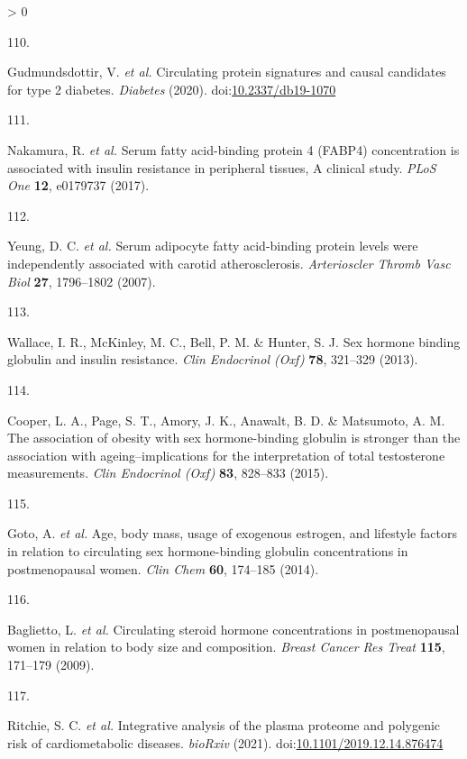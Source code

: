 \documentclass[11pt,twoside]{bristolthesis}
\newlength{\cslhangindent}
\newlength{\csllabelwidth}
\newenvironment{CSLReferences}[2] %
 {%
  \setlength{\parindent}{0pt}
  \ifodd #1 \everypar{\setlength{\hangindent}{\cslhangindent}}\ignorespaces\fi
  \ifnum #2 > 0
  \setlength{\parskip}{#2\baselineskip}
  \fi
 }%
 {}
\newcommand{\CSLLeftMargin}[1]{\parbox[t]{\csllabelwidth}{#1}}
\newcommand{\CSLRightInline}[1]{\parbox[t]{\linewidth - \csllabelwidth}{#1}\break}
\begin{document}
\begin{CSLReferences}{0}{0}
\leavevmode\hypertarget{ref-Gudmundsdottir2020}{}%
\CSLLeftMargin{110. }
\CSLRightInline{Gudmundsdottir, V. \emph{et al.} {Circulating protein signatures and causal candidates for type 2 diabetes}. \emph{Diabetes} (2020). doi:\href{https://doi.org/10.2337/db19-1070}{10.2337/db19-1070}}

\leavevmode\hypertarget{ref-Nakamura2017}{}%
\CSLLeftMargin{111. }
\CSLRightInline{Nakamura, R. \emph{et al.} {Serum fatty acid-binding protein 4 (FABP4) concentration is associated with insulin resistance in peripheral tissues, A clinical study}. \emph{PLoS One} \textbf{12}, e0179737 (2017).}

\leavevmode\hypertarget{ref-Yeung2007}{}%
\CSLLeftMargin{112. }
\CSLRightInline{Yeung, D. C. \emph{et al.} {Serum adipocyte fatty acid-binding protein levels were independently associated with carotid atherosclerosis}. \emph{Arterioscler Thromb Vasc Biol} \textbf{27}, 1796--1802 (2007).}

\leavevmode\hypertarget{ref-Wallace2013}{}%
\CSLLeftMargin{113. }
\CSLRightInline{Wallace, I. R., McKinley, M. C., Bell, P. M. \& Hunter, S. J. {Sex hormone binding globulin and insulin resistance}. \emph{Clin Endocrinol (Oxf)} \textbf{78}, 321--329 (2013).}

\leavevmode\hypertarget{ref-Cooper2015}{}%
\CSLLeftMargin{114. }
\CSLRightInline{Cooper, L. A., Page, S. T., Amory, J. K., Anawalt, B. D. \& Matsumoto, A. M. {The association of obesity with sex hormone-binding globulin is stronger than the association with ageing--implications for the interpretation of total testosterone measurements}. \emph{Clin Endocrinol (Oxf)} \textbf{83}, 828--833 (2015).}

\leavevmode\hypertarget{ref-Goto2014}{}%
\CSLLeftMargin{115. }
\CSLRightInline{Goto, A. \emph{et al.} {Age, body mass, usage of exogenous estrogen, and lifestyle factors in relation to circulating sex hormone-binding globulin concentrations in postmenopausal women}. \emph{Clin Chem} \textbf{60}, 174--185 (2014).}

\leavevmode\hypertarget{ref-Baglietto2009}{}%
\CSLLeftMargin{116. }
\CSLRightInline{Baglietto, L. \emph{et al.} {Circulating steroid hormone concentrations in postmenopausal women in relation to body size and composition}. \emph{Breast Cancer Res Treat} \textbf{115}, 171--179 (2009).}

\leavevmode\hypertarget{ref-Ritchie2019}{}%
\CSLLeftMargin{117. }
\CSLRightInline{Ritchie, S. C. \emph{et al.} {Integrative analysis of the plasma proteome and polygenic risk of cardiometabolic diseases}. \emph{bioRxiv} (2021). doi:\href{https://doi.org/10.1101/2019.12.14.876474}{10.1101/2019.12.14.876474}}


\end{CSLReferences}
\end{document}
